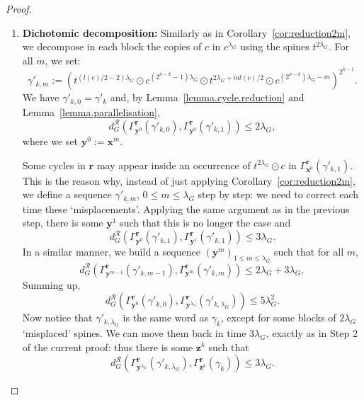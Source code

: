 \documentclass{article}
\begin{document}
\begin{proof}
\begin{enumerate}
In the end, we have that every occurrence of the word $t^{2\lambda_G} \odot c$ in $\gamma'_{k+1}$ is in some sub-word $\left(\gamma'_{k+1}\right)_{\textbf{z}^m_0 + \ldots \textbf{z}^m_{j} + \llbracket 0, \textbf{z}^m_{j+1} \rrbracket}$ for some $j < l$. By another application of Lemma~\ref{lem:changing-sequence}, we have:
\begin{equation}\label{eq:2}
	d^{\mathcal{R}}_G \left(\Gamma^{\textbf{r}}_{\textbf{z}^{k,2\lambda_G}} (\gamma'_{k}), \Gamma^{\textbf{r}}_{\textbf{x}^m} (\gamma'_{k})\right) \le {3\lambda_G}.
\end{equation}
\item \textbf{Dichotomic decomposition:}
Similarly as in Corollary~\ref{cor:reduction2m}, we decompose in each block the copies of $c$ in $c^{\lambda_G}$ using the spines $t^{2\lambda_G}$. For all $m$, we set: 
\[\gamma'_{k,m} := \left(t^{(l(c)/2-2)\lambda_G} \odot c^{\left(2^{n-k}-1\right)\lambda_G} \odot t^{2\lambda_G + ml(c)/2} \odot c^{\left(2^{n-k}\right)\lambda_G-m} \right)^{2^{k-1}}.
\]
We have $\gamma'_{k,0} = \gamma'_k$ and, by Lemma~\ref{lemma.cycle.reduction} and Lemma~\ref{lemma.parallelisation},
\[
d^{\mathcal{R}}_G\left(\Gamma^{\textbf{r}}_{\textbf{y}^0} (\gamma'_{k,0}), \Gamma^{\textbf{r}}_{\textbf{y}^0} (\gamma'_{k,1}) \right) \le 2\lambda_G,
\] 
where we set $\textbf{y}^0 := \textbf{x}^m$.

Some cycles in $\textbf{r}$ may appear inside an occurrence of $t^{2\lambda_G} \odot c$ in $\Gamma^{\textbf{r}}_{\textbf{x}^0} (\gamma'_{k,1})$. This is the reason why, instead of just applying 
 Corollary~\ref{cor:reduction2m}, we define a sequence 
 $\gamma'_{k,m}$, $0 \le m \le \lambda_G$ step by step: we need to correct 
 each time these `misplacements'. Applying the same argument as in the previous step, there is some $\textbf{y}^1$ such that this is no longer the case and 
\[
	d^{\mathcal{R}}_G \left(\Gamma^{\textbf{r}}_{\textbf{y}^0} (\gamma'_{k,1}), \Gamma^{\textbf{r}}_{\textbf{y}^1} (\gamma'_{k,1}) \right) \le { 3\lambda_G}.
\]
In a similar manner, we build a sequence $\left(\textbf{y}^m\right)_{1 \le m \le \lambda_G}$ such that for all $m$, 
\[
d^{\mathcal{R}}_G\left(\Gamma^{\textbf{r}}_{\textbf{y}^{m-1}} (\gamma'_{k,m-1}), \Gamma^{\textbf{r}}_{\textbf{y}^m} (\gamma'_{k,m}) \right) \le 2\lambda_G + { 3 \lambda_G},
\]
Summing up,
\begin{equation}\label{eq:3}
d^{\mathcal{R}}_G\left(\Gamma^{\textbf{r}}_{\textbf{y}^{0}} (\gamma'_{k,0}), \Gamma^{\textbf{r}}_{\textbf{y}^{\lambda_G}} (\gamma'_{k,\lambda_G}) \right) \le { 5}\lambda_G^2.
\end{equation}
Now notice that $\gamma'_{k,\lambda_G}$ is the same word as $\gamma_k$, except for some blocks of $2\lambda_G$ `misplaced' spines. We can move them back in time ${3\lambda_G}$, exactly as in Step 2 of the current proof: thus there is some $\textbf{z}^k$ such that 
\begin{equation}\label{eq:4}
d^{\mathcal{R}}_G\left(\Gamma^{\textbf{r}}_{\textbf{y}^{\lambda_G}} (\gamma'_{k,\lambda_G}), \Gamma^{\textbf{r}}_{\textbf{z}^k} (\gamma_k) \right) \le { 3\lambda_G}.
\end{equation}


\end{enumerate}
\end{proof}
\end{document}
